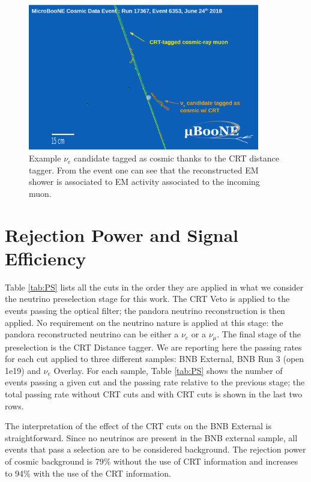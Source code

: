 \begin{figure}[h!]
\centering
\includegraphics[width=0.9\textwidth]{images/crttagger_01.png}
\caption{Example $\nu_e$ candidate tagged as cosmic thanks to the CRT distance tagger. From the event one can see that the reconstructed EM shower is associated to EM activity associated to the incoming muon.}
\label{fig:crtdist00}
\end{figure}


\newpage
\section{Rejection Power and Signal Efficiency}\label{sec:RejectionAndEff}

Table \ref{tab:PS} lists all the cuts in the order they are applied in what we consider the neutrino preselection stage for this work. The CRT Veto is applied to the events passing the optical filter; the pandora neutrino reconstruction is then applied. No requirement on the neutrino nature is applied at this stage: the pandora reconstructed neutrino can be either a $\nu_e$ or a $\nu_\mu$. The final stage of the preselection is the CRT Distance tagger. 
We are reporting here the passing rates for each cut applied to three different samples:  BNB External,  BNB Run 3 (open 1e19) and  $\nu_e$ Overlay. For each sample, Table \ref{tab:PS} shows the number of events passing a given cut and the  passing rate relative to the previous stage; the total passing rate without CRT cuts and with CRT cuts is shown in the last two rows.

The interpretation of the effect of the CRT cuts on the BNB External is straightforward. Since no neutrinos are present in the BNB external sample, all events that pass a selection are to be considered background.  The rejection power of cosmic background is 79\% without the use of CRT information and increases to 94\% with the use of the CRT information.

